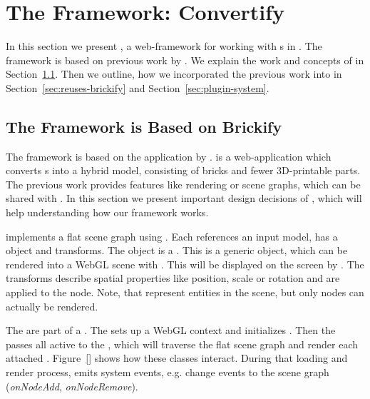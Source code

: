 \documentclass[../ClassicThesis.tex]{subfiles}
\begin{document}
\section{The Framework: Convertify}
\label{sec:framework-convertify}

In this section we present {\convertify}, a web-framework for working
with {\threedmodel}s in {\threejs}. The framework is based on
previous work by \citeauthor{brickify-thesis}. We explain the work and
concepts of \citeauthor{brickify-thesis} in
Section~\ref{sec:based-brickify}. Then we outline, how we incorporated
the previous work into {\convertify} in
Section~\ref{sec:reuses-brickify} and Section~\ref{sec:plugin-system}.

\subsection{The Framework is Based on Brickify}
\label{sec:based-brickify}

The framework {\convertify} is based on the application {\brickify}
by \citeauthor{brickify-thesis}. {\brickify} is a web-application
which converts {\threedmodel}s into a hybrid model, consisting of
{\lego} bricks and fewer 3D-printable parts. The previous work
provides features like rendering or scene graphs, which can be
shared with {\convertify}. In this section we present important
design decisions of {\brickify}, which will help understanding how
our framework
works.

{\brickify} implements a flat scene graph using . Each
 references an input model, has a {\threejs} object and
transforms. The {\threejs} object is a . This
is a generic object, which can be rendered into a WebGL scene with
{\threejs}. This  will be displayed on the
screen by {\brickify}. The transforms describe spatial properties
like position, scale or rotation and are applied to the {\threejs}
node. Note, that  represent entities in the scene, but
only {\threejs} nodes can actually be rendered.

The  are part of a . The 
sets up a WebGL context and initializes {\threejs}. Then the
 passes all active  to the
, which will traverse the flat scene graph and
render each attached .
Figure~\ref{} shows how these classes interact.
During that loading and render process, {\brickify} emits system
events, e.g. change events to the scene graph (\textit{onNodeAdd},
\textit{onNodeRemove}).
\end{document}
